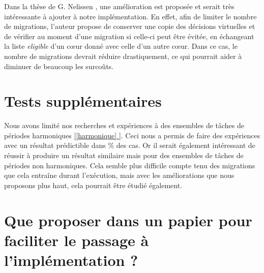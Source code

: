 		Dans la thèse de G. Nelissen \cite{nelissen_geoffrey_efficient_2013}, une amélioration est proposée et serait très intéressante 
		à ajouter à notre implémentation. En effet, afin de limiter le nombre de migrations, l'auteur propose de conserver une 
		copie des décisions \og{}virtuelles\fg{} et de vérifier au moment d'une migration si celle-ci peut être évitée, en 
		échangeant la liste \textit{eligible} d'un cœur donné avec celle d'un autre cœur. Dans ce cas, le nombre de migrations devrait 
		réduire drastiquement, ce qui pourrait aider à diminuer de beaucoup les surcoûts.
		


\section{Tests supplémentaires}

	Nous avons limité nos recherches et expériences à des ensembles de tâches de périodes harmoniques \hyperref[harmonique]{[\ref{harmonique} ]}.
	Ceci nous a permis de faire des expériences avec un résultat prédictible dans  $\%$ des cas.
	Or il serait également intéressant de réussir à produire un résultat similaire mais pour des ensembles de tâches 
	de périodes non harmoniques. Cela semble plus difficile compte tenu des migrations que cela entraîne durant l'exécution, 
	mais avec les améliorations que nous proposons plus haut, cela pourrait être étudié également.

\section{Que proposer dans un papier pour faciliter le passage à l'implémentation ?}

